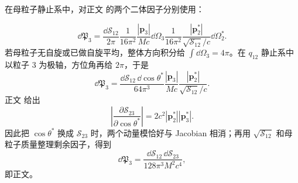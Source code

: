 \begin{derivation}
在母粒子静止系中，对正文 的两个二体因子分别使用：

\begin{equation*}
\dd\mathfrak P_3
=\frac{\dd\mathcal S_{12}}{2\pi}
\frac{1}{16\pi^2}\frac{|\mathbf p_3|}{Mc}\dd\Omega_3
\frac{1}{16\pi^2}\frac{|\mathbf p_2^*|}{\sqrt{\mathcal S_{12}}/c}\dd\Omega_2^*.
\end{equation*}
若母粒子无自旋或已做自旋平均，整体方向积分给 $\int\dd\Omega_3=4\pi$。在 $q_{12}$ 静止系中以粒子 3 为极轴，方位角再给 $2\pi$，于是
\begin{equation*}
\dd\mathfrak P_3
=\frac{\dd\mathcal S_{12}\,\dd\cos\theta^*}{64\pi^3}
\frac{|\mathbf p_3|}{Mc}
\frac{|\mathbf p_2^*|}{\sqrt{\mathcal S_{12}}/c}.
\end{equation*}
正文 给出
\begin{equation*}
\left|\frac{\partial\mathcal S_{23}}{\partial\cos\theta^*}\right|
=2c^2|\mathbf p_2^*||\mathbf p_3^*|.
\end{equation*}
因此把 $\cos\theta^*$ 换成 $\mathcal S_{23}$ 时，两个动量模恰好与 Jacobian 相消；再用 $\sqrt{\mathcal S_{12}}$ 和母粒子质量整理剩余因子，得到
\begin{equation*}
\dd\mathfrak P_3
=\frac{\dd\mathcal S_{12}\,\dd\mathcal S_{23}}{128\pi^3M^2c^4},
\end{equation*}
即正文。
\end{derivation}










